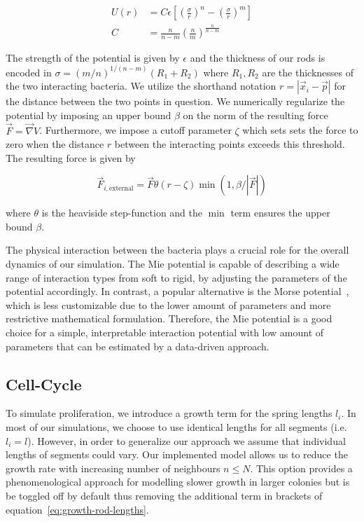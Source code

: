 \documentclass{article}
\begin{document}
\begin{align}
    U(r) &= C\epsilon\left[ \left(\frac{\sigma}{r}\right)^n -
        \left(\frac{\sigma}{r}\right)^m\right]\\
    C &= \frac{n}{n-m}\left(\frac{n}{m}\right)^{\frac{n}{n-m}}
\end{align}

The strength of the potential is given by $\epsilon$ and the thickness of our rods
is encoded in $\sigma = (m/n)^{1/(n-m)}(R_1+R_2)$ where $R_1,R_2$ are the thicknesses of the two
interacting bacteria.
We utilize the shorthand notation $r=|\vec{x}_i - \vec{p}|$ for the distance between the two points
in question.
We numerically regularize the potential by imposing an upper bound $\beta$ on the norm of the
resulting force $\vec{F} = \vec{\nabla} V$.
Furthermore, we impose a cutoff parameter $\zeta$ which sets sets the force to zero when the
distance $r$ between the interacting points exceeds this threshold.
The resulting force is given by

\begin{equation}
    \vec{F}_{i,\text{external}} = \vec{F} \theta(r-\zeta) \min\left(1, \beta / |\vec{F}|\right)
\end{equation}

where $\theta$ is the heaviside step-function and the $\min$ term ensures the upper bound $\beta$.

The physical interaction between the bacteria plays a crucial role for the overall dynamics of our
simulation.
The Mie potential is capable of describing a wide range of interaction types from soft to rigid, by
adjusting the parameters of the potential accordingly.
In contrast, a popular alternative is the Morse potential~\cite{Morse1929}, which is less
customizable due to the lower amount of parameters and more restrictive mathematical formulation.
Therefore, the Mie potential is a good choice for a simple, interpretable interaction potential with
low amount of parameters that can be estimated by a data-driven approach.

\subsection{Cell-Cycle}

To simulate proliferation, we introduce a growth term for the spring lengths $l_i$.
In most of our simulations, we choose to use identical lengths for all segments (i.e. $l_i=l$).
However, in order to generalize our approach we assume that individual lengths of segments could
vary. Our implemented model allows us to reduce the growth rate with increasing number of neighbours
$n\leq N$. This option provides a phenomenological approach for modelling slower growth in larger colonies but
is be toggled off by default thus removing the additional term in brackets of equation~\ref{eq:growth-rod-lengths}.
\end{document}

